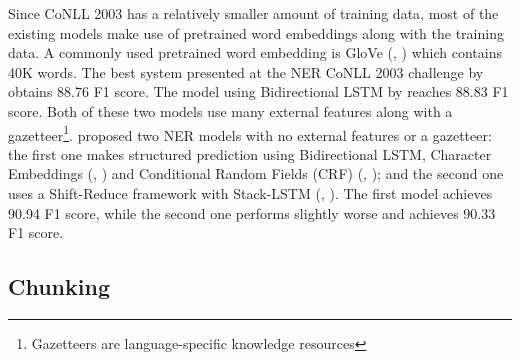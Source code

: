 Since CoNLL 2003 has a relatively smaller amount of training data, most of the existing models make use of pretrained word embeddings along with the training data. A commonly used pretrained word embedding is GloVe (\citeauthor{pennington2014glove}, \citeyear{pennington2014glove}) which contains 40K words. The best system presented at the NER CoNLL 2003 challenge by \cite{florian2003named} obtains 88.76 F1 score. The model using Bidirectional LSTM by \cite{huang2015bidirectional} reaches 88.83 F1 score. Both of these two models use many external features along with a gazetteer\footnote{Gazetteers are language-specific knowledge resources}. \cite{lample2016neural} proposed two NER models with no external features or a gazetteer: the first one makes structured prediction using Bidirectional LSTM, Character Embeddings (\citeauthor{ling2015finding}, \citeyear{ling2015finding}) and Conditional Random Fields (CRF) (\citeauthor{lafferty2001conditional}, \citeyear{lafferty2001conditional}); and the second one uses a Shift-Reduce framework with Stack-LSTM (\citeauthor{dyer2015transition}, \citeyear{dyer2015transition}). The first model achieves 90.94 F1 score, while the second one performs slightly worse and achieves 90.33 F1 score. 

\subsection{Chunking}

